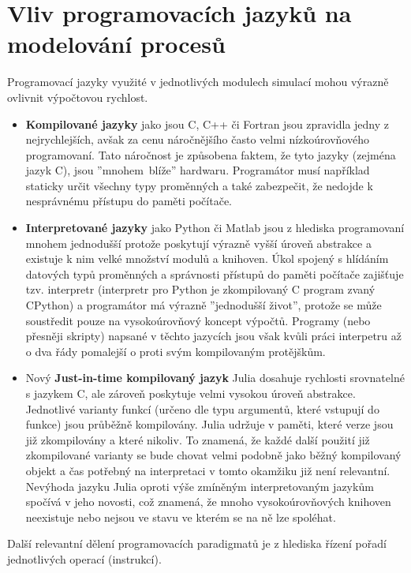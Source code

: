 \section{Vliv programovacích jazyků na modelování procesů}
\label{sec:proglang}
Programovací jazyky využité v jednotlivých modulech simulací mohou výrazně
ovlivnit výpočtovou rychlost.
\begin{itemize}
  \item
    \textbf{Kompilované jazyky} jako jsou C, C++ či Fortran jsou zpravidla
    jedny z nejrychlejších, avšak za cenu náročnějšího často velmi
    nízkoúrovňového programovaní. Tato náročnost je způsobena faktem, že tyto
    jazyky (zejména jazyk C), jsou ''mnohem~blíže'' hardwaru. Programátor musí
    například staticky určit všechny typy proměnných a také zabezpečit, že
    nedojde k nesprávnému přístupu do paměti počítače.
  \item
    \textbf{Interpretované jazyky} jako Python či Matlab jsou z hlediska
    programovaní mnohem jednodušší protože poskytují výrazně vyšší úroveň
    abstrakce a existuje k nim velké množství modulů a knihoven. Úkol spojený s
    hlídáním datových typů proměnných a správnosti přístupů do paměti počítače
    zajišťuje tzv. interpretr (interpretr pro Python je zkompilovaný C program
    zvaný CPython) a programátor má výrazně ''jednodušší život'', protože se
    může soustředit pouze na vysokoúrovňový koncept výpočtů. Programy (nebo
    přesněji skripty) napsané v těchto jazycích jsou však kvůli práci
    interpetru až o dva řády pomalejší o proti svým kompilovaným protějškům.
  \item
    Nový \textbf{Just-in-time kompilovaný jazyk} Julia \cite{julia2017}
    dosahuje rychlosti srovnatelné s jazykem C, ale zároveň poskytuje velmi
    vysokou úroveň abstrakce. Jednotlivé varianty funkcí (určeno dle typu
    argumentů, které vstupují do funkce) jsou průběžně kompilovány. Julia
    udržuje v paměti, které verze jsou již zkompilovány a které nikoliv.
    To znamená, že každé další použití již zkompilované varianty se bude chovat
    velmi podobně jako běžný kompilovaný objekt a čas potřebný na interpretaci
    v tomto okamžiku již není relevantní. Nevýhoda jazyku Julia oproti výše
    zmíněným interpretovaným jazykům spočívá v jeho novosti, což znamená, že
    mnoho vysokoúrovňových knihoven neexistuje nebo nejsou ve stavu ve kterém
    se na ně lze spoléhat.
\end{itemize}
Další relevantní dělení programovacích paradigmatů je z hlediska řízení pořadí
jednotlivých operací (instrukcí).
